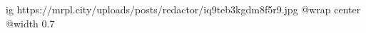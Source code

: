  
 
 
 
 

\ifcmt
  ig https://mrpl.city/uploads/posts/redactor/iq9teb3kgdm8f5r9.jpg
  @wrap center
  @width 0.7
\fi
